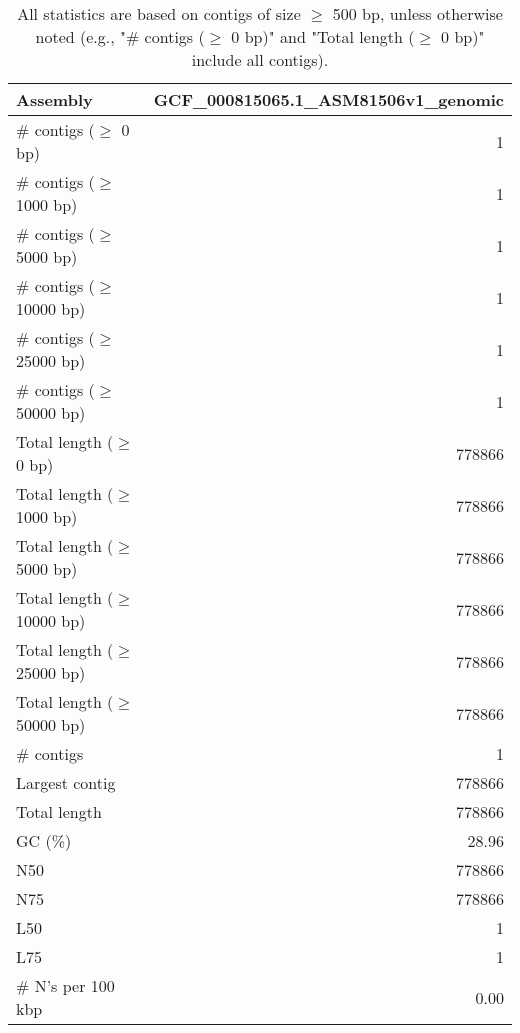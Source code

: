 \documentclass[12pt,a4paper]{article}
\begin{document}
\begin{table}[ht]
\begin{center}
\caption{All statistics are based on contigs of size $\geq$ 500 bp, unless otherwise noted (e.g., "\# contigs ($\geq$ 0 bp)" and "Total length ($\geq$ 0 bp)" include all contigs).}
\begin{tabular}{|l*{1}{|r}|}
\hline
Assembly & GCF\_000815065.1\_ASM81506v1\_genomic \\ \hline
\# contigs ($\geq$ 0 bp) & 1 \\ \hline
\# contigs ($\geq$ 1000 bp) & 1 \\ \hline
\# contigs ($\geq$ 5000 bp) & 1 \\ \hline
\# contigs ($\geq$ 10000 bp) & 1 \\ \hline
\# contigs ($\geq$ 25000 bp) & 1 \\ \hline
\# contigs ($\geq$ 50000 bp) & 1 \\ \hline
Total length ($\geq$ 0 bp) & 778866 \\ \hline
Total length ($\geq$ 1000 bp) & 778866 \\ \hline
Total length ($\geq$ 5000 bp) & 778866 \\ \hline
Total length ($\geq$ 10000 bp) & 778866 \\ \hline
Total length ($\geq$ 25000 bp) & 778866 \\ \hline
Total length ($\geq$ 50000 bp) & 778866 \\ \hline
\# contigs & 1 \\ \hline
Largest contig & 778866 \\ \hline
Total length & 778866 \\ \hline
GC (\%) & 28.96 \\ \hline
N50 & 778866 \\ \hline
N75 & 778866 \\ \hline
L50 & 1 \\ \hline
L75 & 1 \\ \hline
\# N's per 100 kbp & 0.00 \\ \hline
\end{tabular}
\end{center}
\end{table}
\end{document}
